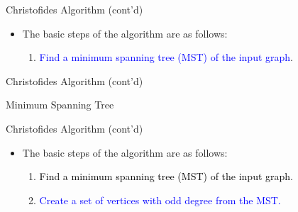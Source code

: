 \documentclass[12pt]{beamer}
\begin{document}
\begin{frame}{Christofides Algorithm (cont'd)}
    \begin{itemize}
        \item The basic steps of the algorithm are as follows:
        \begin{enumerate}
          \item \textcolor{blue}{Find a minimum spanning tree (MST) of the input graph}.
        \end{enumerate}
    \end{itemize}
\end{frame}
\begin{frame}{Christofides Algorithm (cont'd)}
    \begin{block}{Minimum Spanning Tree}
    \begin{center}
    \end{center}
    \end{block}
\end{frame}
\begin{frame}{Christofides Algorithm (cont'd)}
    \begin{itemize}
        \item The basic steps of the algorithm are as follows:
        \begin{enumerate}
          \item \textcolor{black}{Find a minimum spanning tree (MST) of the input graph}.
         \item \textcolor{blue}{Create a set of vertices with odd degree from the MST.}
        \end{enumerate}
    \end{itemize}
\end{frame}
\end{document}
